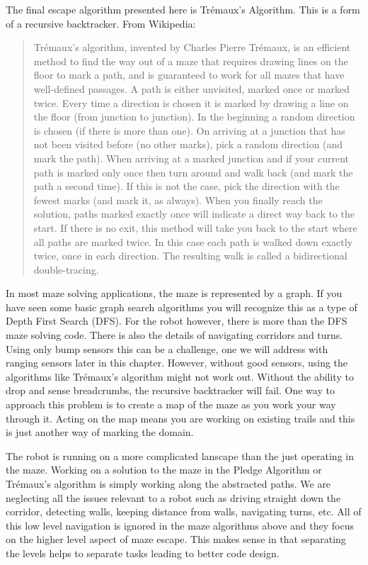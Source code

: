 The final escape algorithm presented here is Trémaux's Algorithm. This
is a form of a recursive backtracker. From Wikipedia:

\begin{quote}
Trémaux's algorithm, invented by Charles Pierre Trémaux, is an efficient
method to find the way out of a maze that requires drawing lines on the
floor to mark a path, and is guaranteed to work for all mazes that have
well-defined passages. A path is either unvisited, marked once or marked
twice. Every time a direction is chosen it is marked by drawing a line
on the floor (from junction to junction). In the beginning a random
direction is chosen (if there is more than one). On arriving at a
junction that has not been visited before (no other marks), pick a
random direction (and mark the path). When arriving at a marked junction
and if your current path is marked only once then turn around and walk
back (and mark the path a second time). If this is not the case, pick
the direction with the fewest marks (and mark it, as always). When you
finally reach the solution, paths marked exactly once will indicate a
direct way back to the start. If there is no exit, this method will take
you back to the start where all paths are marked twice. In this case
each path is walked down exactly twice, once in each direction. The
resulting walk is called a bidirectional double-tracing.
\end{quote}

In most maze solving applications, the maze is represented by a graph.
If you have seen some basic graph search algorithms you will recognize
this as a type of Depth First Search (DFS). For the robot however, there
is more than the DFS maze solving code. There is also the details of
navigating corridors and turns. Using only bump sensors this can be a
challenge, one we will address with ranging sensors later in this
chapter. However, without good sensors, using the algorithms like
Trémaux's algorithm might not work out. Without the ability to drop and
sense breadcrumbs, the recursive backtracker will fail. One way to
approach this problem is to create a map of the maze as you work your
way through it. Acting on the map means you are working on existing
trails and this is just another way of marking the domain.

The robot is running on a more complicated lanscape than the just
operating in the maze. Working on a solution to the maze in the Pledge
Algorithm or Trémaux's algorithm is simply working along the abstracted
paths. We are neglecting all the issues relevant to a robot such as
driving straight down the corridor, detecting walls, keeping distance
from walls, navigating turns, etc. All of this low level navigation is
ignored in the maze algorithms above and they focus on the higher level
aspect of maze escape. This makes sense in that separating the levels
helps to separate tasks leading to better code design.

